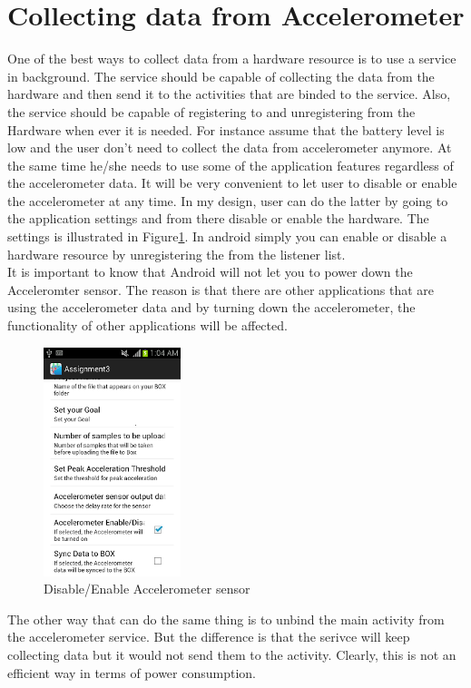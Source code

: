 \documentclass[conference]{IEEEtran}
\begin{document}
\section{Collecting data from Accelerometer}
One of the best ways to collect data from a hardware resource is to use a service in background. The service should be capable of collecting the data from the hardware and then send it to the activities that are binded to the service. Also, the service should be capable of registering to and unregistering from the Hardware when ever it is needed. For instance assume that the battery level is low and the user don't need to collect the data from accelerometer anymore. At the same time he/she needs to use some of the application features regardless of the accelerometer data. It will be very convenient to let user to disable or enable the accelerometer at any time. In my design, user can do the latter by going to the application settings and from there disable or enable the hardware. The settings is illustrated in Figure\ref{DisEnAccel}. In android simply you can enable or disable a hardware resource by unregistering the from the listener list.
\\It is important to know that Android will not let you to power down the Acceleromter sensor. The reason is that there are other applications that are using the accelerometer data and by turning down the accelerometer, the functionality of other applications will be affected. \\
\begin{figure}[H]
\centering
\includegraphics[width=4cm]{DisEnAccel.jpg}
\caption{\scriptsize  Disable/Enable Accelerometer sensor}
\label{DisEnAccel}
\end{figure}
The other way that can do the same thing is to unbind the main activity from the accelerometer service. But the difference is that the serivce will keep collecting data but it would not send them to the activity. Clearly, this is not an efficient way in terms of power consumption.\\
\end{document}
